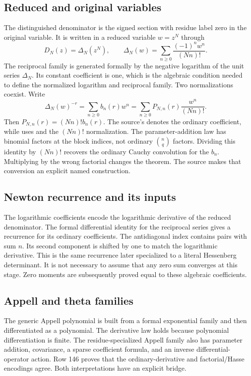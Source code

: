 \subsection{Reduced and original variables}
The distinguished denominator is the signed section with residue label zero in the original variable. It is written in a reduced variable $w=z^N$ through
\[
 D_N(z)=\Delta_N(z^N),\qquad
 \Delta_N(w)=\sum_{n\geq0}\frac{(-1)^nw^n}{(Nn)!}.
\]
The reciprocal family is generated formally by the negative logarithm of the unit series $\Delta_N$. Its constant coefficient is one, which is the algebraic condition needed to define the normalized logarithm and reciprocal family.
Two normalizations coexist. Write
\[
 \Delta_N(w)^{-r}=\sum_{n\geq0}b_n(r)w^n
 =\sum_{n\geq0}P_{N,n}(r)\frac{w^n}{(Nn)!}.
\]
Then $P_{N,n}(r)=(Nn)!b_n(r)$. The source's  denotes the ordinary coefficient, while  uses  and the $(Nn)!$ normalization.
The parameter-addition law has binomial factors at the block indices, not ordinary $\binom nq$ factors.
Dividing this identity by $(Nn)!$ recovers the ordinary Cauchy convolution for the $b_n$. Multiplying by the wrong factorial changes the theorem. The source makes that conversion an explicit named construction.

\subsection{Newton recurrence and its inputs}
The logarithmic coefficients  encode the logarithmic derivative of the reduced denominator. The formal differential identity for the reciprocal series gives a recurrence for its ordinary coefficients.
The antidiagonal index contains pairs with sum $n$. Its second component is shifted by one to match the logarithmic derivative. This is the same recurrence later specialized to a literal Hessenberg determinant. It is not necessary to assume that any zero sum converges at this stage. Zero moments are subsequently proved equal to these algebraic coefficients.

\subsection{Appell and theta families}
The generic Appell polynomial is built from a formal exponential family and then differentiated as a polynomial.
The derivative law holds because polynomial differentiation is finite. The residue-specialized Appell family also has parameter addition, covariance, a sparse coefficient formula, and an inverse differential-operator action. Row 146 proves that the ordinary-derivative and factorial/Hasse encodings agree. Both interpretations have an explicit bridge.

